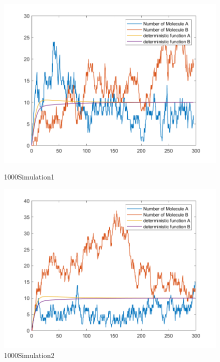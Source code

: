 \documentclass{article}
\begin{document}
\begin{figure}[htbp]
    \centering
    \begin{minipage}{0.45\linewidth}
        \centering
        \includegraphics[width=\linewidth]{graph/b1.png}
        \caption{1000Simulation1}
        \label{b1}
    \end{minipage}
    \hfill
    \begin{minipage}{0.45\linewidth}
        \centering
        \includegraphics[width=\linewidth]{graph/b2.png}
        \caption{1000Simulation2}
        \label{b2}
    \end{minipage}
\end{figure}
\end{document}
